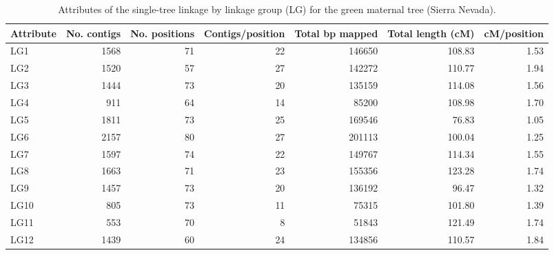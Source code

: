 \documentclass[smallextended]{svjour3}
\begin{document}
\clearpage
\begin{landscape}

\begin{table}[ht]
\caption{Attributes of the single-tree linkage by linkage group (LG) for the green maternal tree (Sierra Nevada).} 
\begin{tabular}{lrrrrrr}
\toprule
Attribute & No. contigs & No. positions & Contigs/position & Total bp mapped & Total length (cM) & cM/position \\
\midrule
LG1 & 1568 & 71 & 22 & \num{146650} & 108.83 & 1.53 \\
LG2 & 1520 & 57 & 27 & \num{142272} & 110.77 & 1.94 \\
LG3 & 1444 & 73 & 20 & \num{135159} & 114.08 & 1.56 \\
LG4 & 911 & 64 & 14 & \num{85200} & 108.98 & 1.70 \\
LG5 & 1811 & 73 & 25 & \num{169546} & 76.83 & 1.05 \\
LG6 & 2157 & 80 & 27 & \num{201113} & 100.04 & 1.25 \\
LG7 & 1597 & 74 & 22 & \num{149767} & 114.34 & 1.55 \\
LG8 & 1663 & 71 & 23 & \num{155356} & 123.28 & 1.74 \\
LG9 & 1457 & 73 & 20 & \num{136192} & 96.47 & 1.32 \\
LG10 & 805 & 73 & 11 & \num{75315} & 101.80 & 1.39 \\
LG11 & 553 & 70 & 8 & \num{51843} & 121.49 & 1.74 \\
LG12 & 1439 & 60 & 24 & \num{134856} & 110.57 & 1.84 \\
\bottomrule
\end{tabular}
\label{t:label}
\end{table}
\end{landscape}
\end{document}
